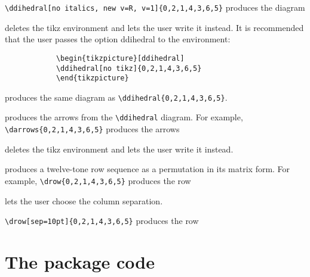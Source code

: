 \documentclass{article}
\begin{document}
\begin{itemize}
	\verb|\ddihedral[no italics, new v=R, v=1]{0,2,1,4,3,6,5}| produces the diagram\\
	
		\begin{itemize}
			 deletes the tikz environment and lets the user write it instead. It is recommended that the user passes the option \textsf{ddihedral} to the environment:
			\begin{verbatim}
			\begin{tikzpicture}[ddihedral]
			\ddihedral[no tikz]{0,2,1,4,3,6,5}
			\end{tikzpicture}
			\end{verbatim} produces the same diagram as  \verb|\ddihedral{0,2,1,4,3,6,5}|.
		\end{itemize}
		
		 produces the arrows from the \verb|\ddihedral| diagram. For example,
 		\verb|\darrows{0,2,1,4,3,6,5}| produces the arrows\\
 		\darrows{0,2,1,4,3,6,5}
 		
 		\begin{itemize}
 			 deletes the tikz environment and lets the user write it instead.
 		\end{itemize}
		
		 produces a twelve-tone row sequence as a permutation in its matrix form. For example, \verb|\drow{0,2,1,4,3,6,5}| produces the row
		
		\drow{0,2,1,4,3,6,5}
		
		\begin{itemize}
			 lets the user choose the column separation.
		\end{itemize}
		
		\verb|\drow[sep=10pt]{0,2,1,4,3,6,5}| produces the row
		
		\drow[sep=10pt]{0,2,1,4,3,6,5}
		
	\end{itemize}
	
	\section{The package code}	
	\lstset{
		language=[Latex]Tex,
		basicstyle=\footnotesize\sffamily,
		keywordstyle=\footnotesize\sffamily,
		identifierstyle=\footnotesize\sffamily,
		commentstyle=\footnotesize\sffamily,
		stringstyle=\footnotesize\sffamily,
		escapechar=¬,
		numberstyle=\footnotesize\sffamily,%
		numbers=left,
		stepnumber=2,
		numbersep=15pt,
		columns=flexible,
		showstringspaces=false,
		tabsize=4,
	}
	
	
\end{document}
